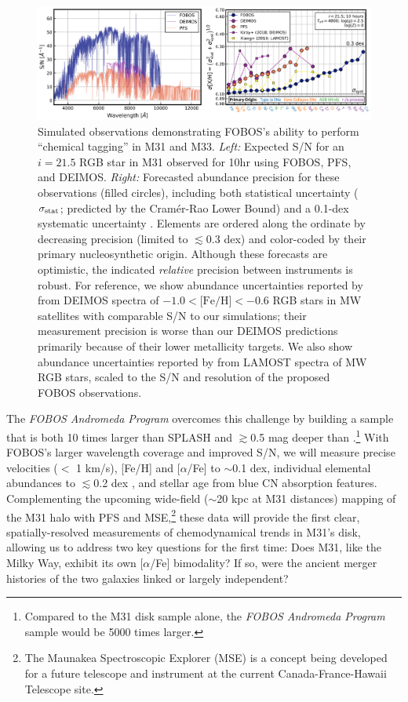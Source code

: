 \documentclass[11pt,a4paper,twoside,onecolumn,openany,final,oldfontcommands]{memoir}
\begin{document}
\begin{figure}
\includegraphics[width=1.0\textwidth]{figs/abundances_snr_v6.png}
\caption{Simulated observations demonstrating FOBOS's ability to perform ``chemical tagging'' in M31 and M33. \textit{Left:} Expected S/N for an $i=21.5$ RGB star in M31 observed for 10hr using FOBOS, PFS, and DEIMOS. \textit{Right:}  Forecasted abundance precision for these observations (filled circles), including both statistical uncertainty ($\sigma_{\rm stat}$; predicted by the Cram\'er-Rao Lower Bound) and a 0.1-dex systematic uncertainty \citep[$\sigma_{\rm syst}$; cf.,][]{kirby18, Xiang2019}. Elements are ordered along the ordinate by decreasing precision (limited to $\lesssim$0.3 dex) and color-coded by their primary nucleosynthetic origin. Although these forecasts are optimistic, the indicated {\it relative} precision between instruments is robust. For reference, we show abundance uncertainties reported by \citet[][purple squares]{kirby18} from DEIMOS spectra of $-1.0<\text{[Fe/H]}<-0.6$ RGB stars in MW satellites with comparable S/N to our simulations; their measurement precision is worse than our DEIMOS predictions primarily because of their lower metallicity targets.  We also show abundance uncertainties reported by \citet[][yellow squares]{Xiang2019} from LAMOST spectra of MW RGB stars, scaled to the S/N and resolution of the proposed FOBOS  observations.}
\label{fig:abundances_snr}
\end{figure}

The {\it FOBOS Andromeda Program} overcomes this challenge by building a sample that is both 10 times larger than SPLASH and $\gtrsim$0.5 mag deeper than \citet{Escala20}.\footnote{Compared to the \citet{Escala20} M31 disk sample alone, the {\it FOBOS Andromeda Program} sample would be 5000 times larger.}  With FOBOS's larger wavelength coverage and improved S/N, we will measure precise velocities ($<$ 1 km/s), [Fe/H] and [$\alpha$/Fe] to $\sim$0.1 dex, individual elemental abundances to $\lesssim$0.2 dex \citep[Fig.~\ref{fig:abundances_snr}; cf.][]{YST2017}, and stellar age from blue CN absorption features.  Complementing the upcoming wide-field ($\sim$20 kpc at M31 distances) mapping of the M31 halo with PFS and MSE,\footnote{The Maunakea Spectroscopic Explorer (MSE) is a concept being developed for a future telescope and instrument at the current Canada-France-Hawaii Telescope site.} these data will provide the first clear, spatially-resolved measurements of chemodynamical trends in M31's disk, allowing us to address two key questions for the first time: Does M31, like the Milky Way, exhibit its own [$\alpha$/Fe] bimodality?  If so, were the ancient merger histories of the two galaxies linked or largely independent?
\end{document}
